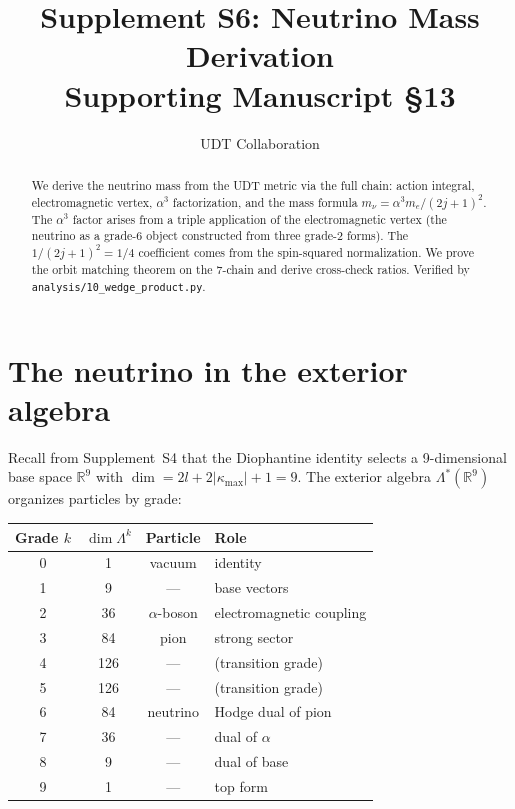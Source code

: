 \documentclass[11pt,letterpaper]{article}
\title{Supplement S6: Neutrino Mass Derivation \\
\large Supporting Manuscript \S13}
\author{UDT Collaboration}
\date{}
\numberwithin{equation}{section}
\begin{document}
\maketitle

\begin{abstract}
We derive the neutrino mass from the UDT metric via the full chain:
action integral, electromagnetic vertex, $\alpha^3$ factorization, and the
mass formula $m_\nu = \alpha^3 m_e/(2j+1)^2$. The $\alpha^3$ factor
arises from a triple application of the electromagnetic vertex (the neutrino
as a grade-6 object constructed from three grade-2 forms). The $1/(2j+1)^2 = 1/4$
coefficient comes from the spin-squared normalization. We prove the orbit
matching theorem on the 7-chain and derive cross-check ratios. Verified by
\texttt{analysis/10\_wedge\_product.py}.
\end{abstract}

\tableofcontents

\section{The neutrino in the exterior algebra}
\label{sec:exterior}

Recall from Supplement~S4 that the Diophantine identity selects a
9-dimensional base space $\mathbb{R}^9$ with $\dim = 2l + 2|\kappa_\mathrm{max}| + 1 = 9$.
The exterior algebra $\Lambda^*(\mathbb{R}^9)$ organizes particles by grade:

\begin{center}
\begin{tabular}{cccl}
\toprule
Grade $k$ & $\dim\Lambda^k$ & Particle & Role \\
\midrule
0 & 1 & vacuum & identity \\
1 & 9 & --- & base vectors \\
2 & 36 & $\alpha$-boson & electromagnetic coupling \\
3 & 84 & pion & strong sector \\
4 & 126 & --- & (transition grade) \\
5 & 126 & --- & (transition grade) \\
6 & 84 & neutrino & Hodge dual of pion \\
7 & 36 & --- & dual of $\alpha$ \\
8 & 9 & --- & dual of base \\
9 & 1 & --- & top form \\
\bottomrule
\end{tabular}
\end{center}
\end{document}
